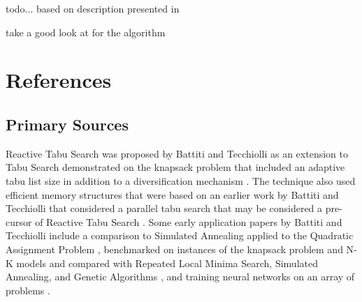 \documentclass[a4paper, 11pt]{article}
\begin{document}
todo... based on description presented in \cite{Battiti1994}

take a good look at \cite{Battiti1995a} for the algorithm




\section{References}
\label{sec:references}

% 
% 
\subsection{Primary Sources}
Reactive Tabu Search was proposed by Battiti and Tecchiolli as an extension to Tabu Search demonstrated on the knapsack problem that included an adaptive tabu list size in addition to a diversification mechanism \cite{Battiti1994}. The technique also used efficient memory structures that were based on an earlier work by Battiti and Tecchiolli that considered a parallel tabu search that may be considered a pre-cursor of Reactive Tabu Search \cite{Battiti1992}.
Some early application papers by Battiti and Tecchiolli include a comparison to Simulated Annealing applied to the Quadratic Assignment Problem  \cite{Battiti1994a}, benchmarked on instances of the knapsack problem and N-K models and compared with Repeated Local Minima Search, Simulated Annealing, and Genetic Algorithms \cite{Battiti1995a}, and training neural networks on an array of problems \cite{Battiti1995b}.

% 
% 
\end{document}
